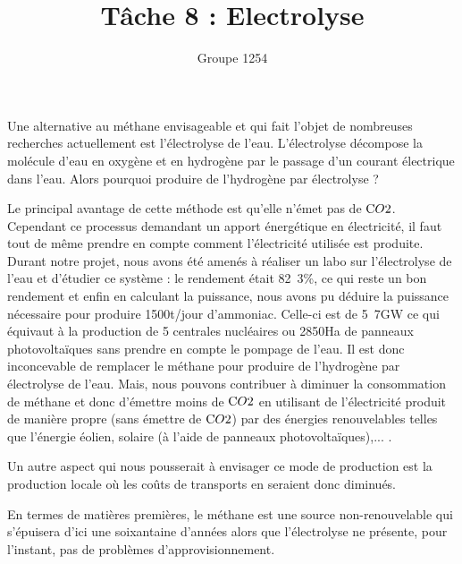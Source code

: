 \documentclass[10pt,a4paper]{article}
\title{Tâche 8 : Electrolyse}
\author{Groupe 1254}
\begin{document}
\maketitle

Une alternative au méthane envisageable et qui fait l'objet de nombreuses recherches actuellement est l’électrolyse de l'eau. L’électrolyse décompose la molécule d'eau en oxygène et en hydrogène par le passage d'un courant électrique dans l'eau. Alors pourquoi produire de l'hydrogène par électrolyse ? 

Le principal avantage de cette méthode est qu'elle n'émet pas de $\ce CO2$. Cependant ce processus demandant un apport énergétique en électricité, il faut tout de même prendre en compte comment l'électricité utilisée est produite. Durant notre projet, nous avons été amenés à réaliser un labo sur l’électrolyse de l'eau et d'étudier ce système : le rendement était \unit{82.3}{\%}, ce qui reste un bon rendement et enfin en calculant la puissance, nous avons pu déduire la puissance nécessaire pour produire \unit{1500}{t/jour} d'ammoniac. Celle-ci est de \unit{5.7}{GW} ce qui équivaut à la production de 5 centrales nucléaires ou \unit{2850}{Ha} de panneaux photovoltaïques sans prendre en compte le pompage de l'eau. Il est donc inconcevable de remplacer le méthane pour produire de l'hydrogène par électrolyse de l'eau. Mais, nous pouvons contribuer à diminuer la consommation de méthane et donc d'émettre moins de $\ce CO2$ en utilisant de l’électricité produit de manière propre (sans émettre de $\ce CO2$) par des énergies renouvelables telles que l'énergie éolien, solaire (à l'aide de panneaux photovoltaïques),...  .

Un autre aspect qui nous pousserait à envisager ce mode de production est la production locale où les coûts de transports en seraient donc diminués. 

En termes de matières premières, le méthane est une source non-renouvelable qui s'épuisera d'ici une soixantaine d'années alors que l’électrolyse ne présente, pour l'instant, pas de problèmes d'approvisionnement.
\end{document}
